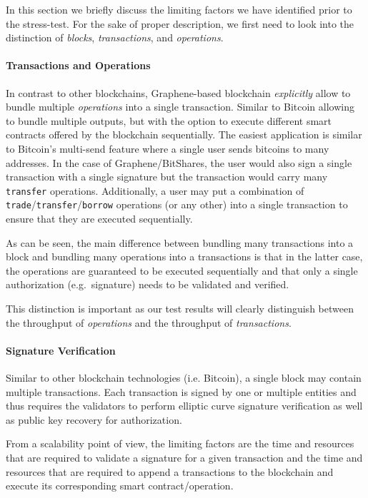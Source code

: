 In this section we briefly discuss the limiting factors we have identified
prior to the stress-test. For the sake of proper description, we first need to
look into the distinction of \emph{blocks}, \emph{transactions}, and
\emph{operations}.

\paragraph{Transactions and Operations}
In contrast to other blockchains, Graphene-based blockchain \emph{explicitly}
allow to bundle multiple \emph{operations} into a single transaction. Similar
to Bitcoin allowing to bundle multiple outputs, but with the option to execute
different smart contracts offered by the blockchain sequentially. The easiest
application is similar to Bitcoin's multi-send feature where a single user
sends bitcoins to many addresses. In the case of Graphene/BitShares, the user
would also sign a single transaction with a single signature but the
transaction would carry many \texttt{transfer} operations. Additionally, a
user may put a combination of \texttt{trade}/\texttt{transfer}/\texttt{borrow}
operations (or any other) into a single transaction to ensure that they are
executed sequentially.

As can be seen, the main difference between bundling many transactions into a
block and bundling many operations into a transactions is that in the latter
case, the operations are guaranteed to be executed sequentially and that only a
single authorization (e.g.\ signature) needs to be validated and verified.

This distinction is important as our test results will clearly distinguish
between the throughput of \emph{operations} and the throughput of
\emph{transactions}.

\paragraph{Signature Verification}
Similar to other blockchain technologies (i.e. Bitcoin), a single block may
contain multiple transactions. Each transaction is signed by one or multiple
entities and thus requires the validators to perform elliptic curve signature
verification as well as public key recovery for authorization.

From a scalability point of view, the limiting factors are the time and
resources that are required to validate a signature for a given transaction and
the time and resources that are required to append a transactions to the
blockchain and execute its corresponding smart contract/operation.

